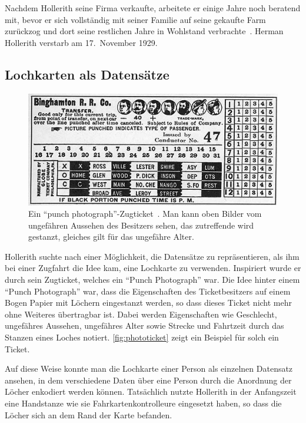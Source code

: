 \documentclass[parskip=half]{scrartcl}
\begin{document}
Nachdem Hollerith seine Firma verkaufte, arbeitete er einige Jahre noch
beratend mit, bevor er sich vollständig mit seiner Familie auf seine gekaufte
Farm zurückzog und dort seine restlichen Jahre in Wohlstand
verbrachte~\cite{austrian1982herman}. Herman Hollerith verstarb am 17.~November
1929.

\subsection{Lochkarten als Datensätze}
\label{sec:lochkarten}

\begin{figure}[h]
  \centering
  \includegraphics[width=\textwidth]{phototicket}
  \caption{Ein \enquote{punch photograph}-Zugticket~\cite{phototicket}.
    Man kann oben Bilder vom ungefähren Aussehen des Besitzers sehen, das
    zutreffende wird gestanzt, gleiches gilt für das ungefähre Alter.}
  \label{fig:phototicket}
\end{figure}

Hollerith suchte nach einer Möglichkeit, die Datensätze zu repräsentieren, als
ihm bei einer Zugfahrt die Idee kam, eine Lochkarte zu verwenden. Inspiriert
wurde er durch sein Zugticket, welches ein \enquote{Punch Photograph} war. Die
Idee hinter einem \enquote{Punch Photograph} war, dass die Eigenschaften des
Ticketbesitzers auf einem Bogen Papier mit Löchern eingestanzt werden, so dass
dieses Ticket nicht mehr ohne Weiteres übertragbar ist. Dabei werden
Eigenschaften wie Geschlecht, ungefähres Aussehen, ungefähres Alter sowie
Strecke und Fahrtzeit durch das Stanzen eines Loches notiert.
\autoref{fig:phototicket} zeigt ein Beispiel für solch ein Ticket.

Auf diese Weise konnte man die Lochkarte einer Person als einzelnen Datensatz
ansehen, in dem verschiedene Daten über eine Person durch die Anordnung der
Löcher enkodiert werden können. Tatsächlich nutzte Hollerith in der Anfangszeit
eine Handstanze wie sie Fahrkartenkontrolleure eingesetzt haben, so dass die
Löcher sich an dem Rand der Karte befanden.
\end{document}
